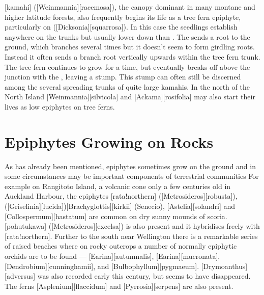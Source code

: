 [kamahi] ([Weinmannia][racemosa]), the canopy dominant in many montane and higher latitude forests, also frequently begins its life as a tree fern epiphyte, particularly on  ([Dicksonia][squarrosa]).
In this case the seedlings establish anywhere on the trunks but usually lower down than .
The  sends a root to the ground, which branches several times but it doesn't seem to form girdling roots.
Instead it often sends a branch root vertically upwards within the tree fern trunk.
The tree fern continues to grow for a time, but eventually breaks off above the junction with the , leaving a stump.
This stump can often still be discerned among the several spreading trunks of quite large kamahis.
In the north of the North Island [Weinmannia][silvicola] and [Ackama][rosifolia] may also start their lives as low epiphytes on tree ferns.

\section{Epiphytes Growing on Rocks}

As has already been mentioned, epiphytes sometimes grow on the ground and in some circumstances may be important components of terrestrial communities For example on Rangitoto Island, a volcanic cone only a few centuries old in Auckland Harbour, the epiphytes [rata!northern] ([Metrosideros][robusta]),  ([Griselinia][lucida])[Brachyglottis][kirkii] (Senecio),  [Astelia][solandri] and [Collospermum][hastatum] are common on dry sunny mounds of scoria.
[pohutukawa] ([Metrosideros][excelsa]) is also present and it hybridises freely with [rata!northern].
Further to the south near Wellington there is a remarkable series of raised beaches where on rocky outcrops a number of normally epiphytic orchids are to be found --- [Earina][autumnalis], [Earina][mucronata], [Dendrobium][cunninghamii], and [Bulbophyllum][pygmaeum]. [Drymoanthus][adversus] was also recorded early this century, but seems to have disappeared.
The ferns [Asplenium][flaccidum] and [Pyrrosia][serpens] are also present.

